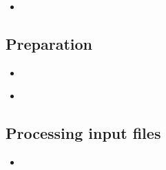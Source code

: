 \documentclass[compress, ucs, xelatex, 11pt, xcolor=x11names, aspectratio=1609,
	hyperref={
		bookmarks=true,
		unicode=true,
		colorlinks=true,
		pdftitle={HybSeq course},
		plainpages=false,
		pdfauthor={Vojtech Zeisek},
		pdfsubject={Practical processing of HybSeq target enrichment sequencing data on computing grids like MetaCentrum},
		pdfcreator={XeLaTeX},
		pdfkeywords={BASH, command line, GNU, HybSeq, Linux, MetaCentrum, sequencing shell, target enrichment},
		linkcolor=Cyan2, %
		anchorcolor=Firebrick2, %
		citecolor=Firebrick2, %
		filecolor=Firebrick2, %
		menucolor=Firebrick2, %
		urlcolor=Chartreuse2, %
		pdftex},
	url={hyphens, lowtilde} %
	]{beamer}
\begin{document}
\begin{frame}[fragile]{}
	\begin{itemize}
		\item 
	\end{itemize}
	\begin{spluscode}
    
	\end{spluscode}
	\begin{bashcode}
    
	\end{bashcode}
\end{frame}

\subsection{Preparation}

\begin{frame}[fragile]{}
	\begin{itemize}
		\item 
	\end{itemize}
	\begin{spluscode}
    
	\end{spluscode}
	\begin{bashcode}
    
	\end{bashcode}
\end{frame}

\begin{frame}[fragile]{}
	\begin{itemize}
		\item 
	\end{itemize}
	\begin{spluscode}
    
	\end{spluscode}
	\begin{bashcode}
    
	\end{bashcode}
\end{frame}

\subsection{Processing input files}

\begin{frame}[fragile]{}
	\begin{itemize}
		\item 
	\end{itemize}
	\begin{spluscode}
    
	\end{spluscode}
	\begin{bashcode}
    
	\end{bashcode}
\end{frame}
\end{document}
